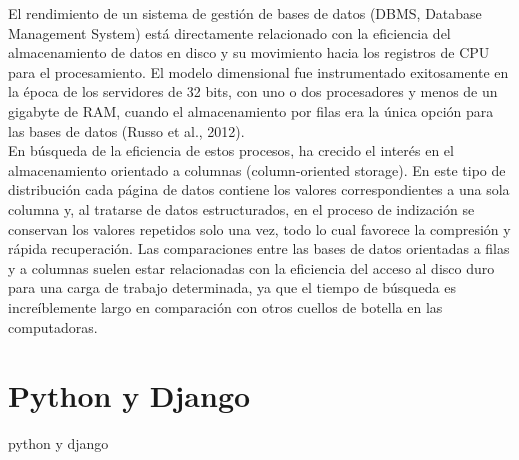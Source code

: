El rendimiento de un sistema de gestión de bases de datos (DBMS, Database Management System) está directamente relacionado con la eficiencia del almacenamiento de datos en disco y su movimiento hacia los registros de CPU para el procesamiento. El modelo dimensional fue instrumentado exitosamente en la época de los servidores de 32 bits, con uno o dos procesadores y menos de un gigabyte de RAM, cuando el almacenamiento por filas era la única opción para las bases de datos (Russo et al., 2012). \\

En búsqueda de la eficiencia de estos procesos, ha crecido el interés en el almacenamiento orientado a columnas (column-oriented storage). En este tipo de distribución cada página de datos contiene los valores correspondientes a una sola columna y, al tratarse de datos estructurados, en el proceso de indización se conservan los valores repetidos solo una vez, todo lo cual favorece la compresión y rápida recuperación. Las comparaciones entre las bases de datos orientadas a filas y a columnas suelen estar relacionadas con la eficiencia del acceso al disco duro para una carga de trabajo determinada, ya que el tiempo de búsqueda es increíblemente largo en comparación con otros cuellos de botella en las computadoras.


\section*{Python y Django}\label{py_dj}
python y django



